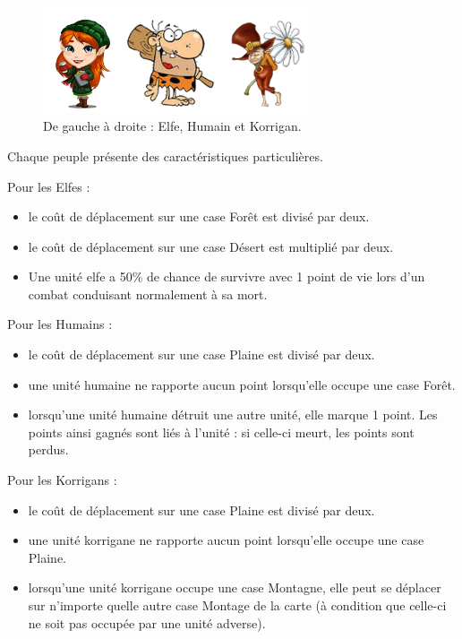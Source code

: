 	\begin{figure}[h!]
			\begin{center}
				\includegraphics[width=0.7\textwidth]{figure/peuple.png}
			\end{center}
			\caption{De gauche à droite : Elfe, Humain et Korrigan.}
			\label{fig:peuple}
	\end{figure}
	
	
	\newpage
	Chaque peuple présente des caractéristiques particulières.
	
		Pour les Elfes :
		\begin{itemize}
			\item le coût de déplacement sur une case Forêt est divisé par deux. 
			\item le coût de déplacement sur une case Désert est multiplié par deux.
			\item Une unité elfe a 50\% de chance de survivre avec 1 point de vie lors d’un combat conduisant normalement à sa mort.
		\end{itemize}
		
		Pour les Humains :
		\begin{itemize}
			\item le coût de déplacement sur une case Plaine est divisé par deux.
			\item une unité humaine ne rapporte aucun point lorsqu'elle occupe une case Forêt.
			\item lorsqu’une unité humaine détruit une autre unité, elle marque 1 point. Les points ainsi gagnés sont liés à l'unité : si celle-ci meurt, les points sont perdus.
		\end{itemize}
		
		Pour les Korrigans :
		\begin{itemize}
			\item le coût de déplacement sur une case Plaine est divisé par deux.
			\item une unité korrigane ne rapporte aucun point lorsqu'elle occupe une case Plaine.
			\item lorsqu'une unité korrigane occupe une case Montagne, elle peut se déplacer sur n’importe quelle autre case Montage de la carte (à condition que celle-ci ne soit pas occupée par une unité adverse).
		\end{itemize}

